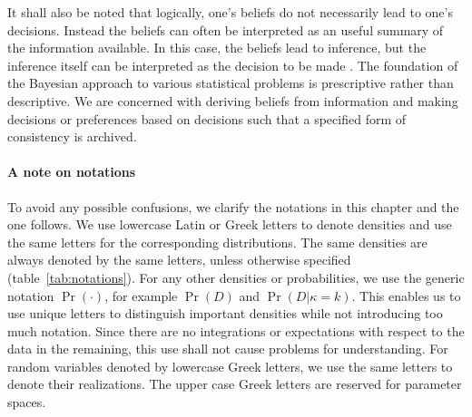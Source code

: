 It shall also be noted that logically, one's beliefs do not necessarily lead
to one's decisions. Instead the beliefs can often be interpreted as an useful
summary of the information available. In this case, the beliefs lead to
inference, but the inference itself can be interpreted as the decision to be
made \parencite[][chap.~1]{Lehmann:2005vy}. The foundation of the Bayesian
approach to various statistical problems is prescriptive rather than
descriptive. We are concerned with deriving beliefs from information and
making decisions or preferences based on decisions such that a specified form
of consistency is archived.

\paragraph{A note on notations} To avoid any possible confusions, we clarify
the notations in this chapter and the one follows. We use lowercase Latin or
Greek letters to denote densities and use the same letters for the
corresponding distributions. The same densities are always denoted by the same
letters, unless otherwise specified (table~\ref{tab:notations}). For any other
densities or probabilities, we use the generic notation $\Pr(\cdot)$, for
example $\Pr(D)$ and $\Pr(D|\kappa=k)$. This enables us to use unique letters
to distinguish important densities while not introducing too much notation.
Since there are no integrations or expectations with respect to the data in
the remaining, this use shall not cause problems for understanding. For random
variables denoted by lowercase Greek letters, we use the same letters to
denote their realizations. The upper case Greek letters are reserved for
parameter spaces.


